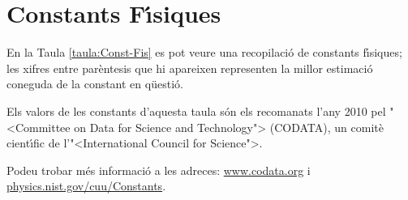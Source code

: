 \chapter{Constants F\'{\i}siques} 


En la Taula \vref{taula:Const-Fis} es pot veure una recopilaci\'{o} de
constants f\'{\i}siques; les xifres entre par\`{e}ntesis que hi apareixen representen la millor
estimaci\'{o} coneguda de la constant en q\"{u}esti\'{o}.

Els valors de les constants d'aquesta taula s\'{o}n els recomanats
l'any 2010 pel {"<}Committee on Data for Science and Technology{">}
(\textsf{CODATA}), un comit\`{e} cient\'{\i}fic de l'{"<}International Council
for Science{">}.

Podeu trobar  m\'{e}s informaci\'{o} a
les adreces: \href{http://www.codata.org/}{www.codata.org} i \href{http://physics.nist.gov/cuu/Constants/}{physics.nist.gov/cuu/Constants}.



